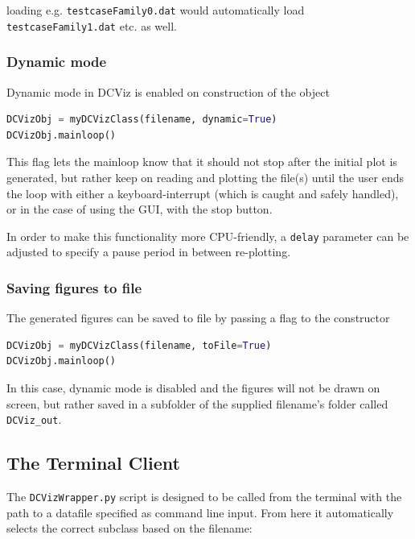 loading e.g. \verb+testcaseFamily0.dat+ would automatically load \verb+testcaseFamily1.dat+ etc. as well.


\subsubsection{Dynamic mode}

Dynamic mode in DCViz is enabled on construction of the object

\begin{lstlisting}[language=Python, otherkeywords={True}]
DCVizObj = myDCVizClass(filename, dynamic=True)
DCVizObj.mainloop()
\end{lstlisting}

This flag lets the mainloop know that it should not stop after the initial plot is generated, but rather keep on reading and plotting the file(s) until the user ends the loop with either a keyboard-interrupt (which is caught and safely handled), or in the case of using the GUI, with the stop button.

In order to make this functionality more CPU-friendly, a \verb+delay+ parameter can be adjusted to specify a pause period in between re-plotting.


\subsubsection{Saving figures to file}

The generated figures can be saved to file by passing a flag to the constructor

\begin{lstlisting}[language=Python, otherkeywords={True}]
DCVizObj = myDCVizClass(filename, toFile=True)
DCVizObj.mainloop()
\end{lstlisting}

In this case, dynamic mode is disabled and the figures will not be drawn on screen, but rather saved in a subfolder of the supplied filename's folder called \verb+DCViz_out+.

\subsection{The Terminal Client}

The \verb+DCVizWrapper.py+ script is designed to be called from the terminal with the path to a datafile specified as command line input. From here it automatically selects the correct subclass based on the filename:

